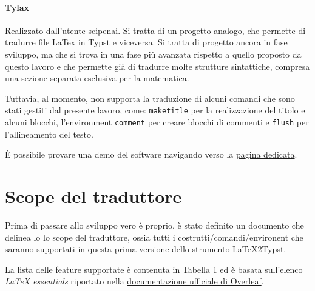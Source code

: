 \documentclass{article}
\begin{document}
    \paragraph{\href{https://github.com/scipenai/tylax}{Tylax}}

    Realizzato dall'utente \href{https://github.com/scipenai}{scipenai}. Si tratta di un progetto analogo, che permette di tradurre file LaTex in Typst e viceversa. Si tratta di progetto ancora in fase sviluppo, ma che si trova in una fase più avanzata rispetto a quello proposto da questo lavoro e che permette già di tradurre molte strutture sintattiche, compresa una sezione separata esclusiva per la matematica.

    Tuttavia, al momento, non supporta la traduzione di alcuni comandi che sono stati gestiti dal presente lavoro, come: \texttt{maketitle} per la realizzazione del titolo e alcuni blocchi, l'environment \texttt{comment} per creare blocchi di commenti e \texttt{flush} per l'allineamento del testo.

    È possibile provare una demo del software navigando verso la \href{https://convert.silkyai.cn}{pagina dedicata}.

    \section{Scope del traduttore}
    Prima di passare allo sviluppo vero è proprio, è stato definito un documento che delinea lo lo scope del traduttore, ossia tutti i costrutti/comandi/environent che saranno supportati in questa prima versione dello strumento LaTeX2Typst.

    La lista delle feature supportate è contenuta in Tabella 1 ed è basata sull'elenco \textit{LaTeX essentials} riportato nella \href{https://www.overleaf.com/learn}{documentazione ufficiale di Overleaf}.
\end{document}
